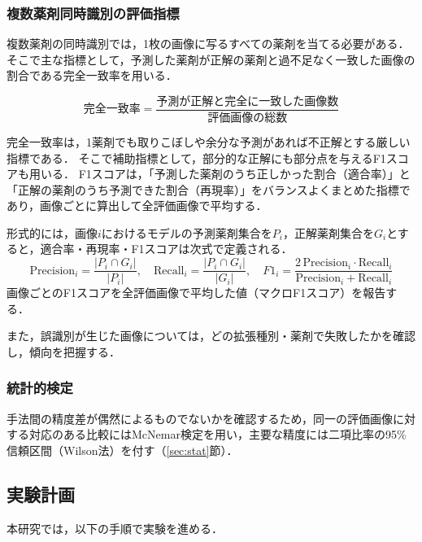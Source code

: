 \documentclass[dvipdfmx]{jsarticle}
\begin{document}
\subsubsection{複数薬剤同時識別の評価指標}

複数薬剤の同時識別では，1枚の画像に写るすべての薬剤を当てる必要がある．
そこで主な指標として，予測した薬剤が正解の薬剤と過不足なく一致した画像の割合である完全一致率を用いる．

\begin{equation}
\text{完全一致率} = \frac{\text{予測が正解と完全に一致した画像数}}{\text{評価画像の総数}}
\label{eq:exact}
\end{equation}

完全一致率は，1薬剤でも取りこぼしや余分な予測があれば不正解とする厳しい指標である．
そこで補助指標として，部分的な正解にも部分点を与えるF1スコアも用いる．
F1スコアは，「予測した薬剤のうち正しかった割合（適合率）」と「正解の薬剤のうち予測できた割合（再現率）」をバランスよくまとめた指標であり，画像ごとに算出して全評価画像で平均する．

形式的には，画像$i$におけるモデルの予測薬剤集合を$P_i$，正解薬剤集合を$G_i$とすると，適合率・再現率・F1スコアは次式で定義される．
\begin{equation}
\mathrm{Precision}_i = \frac{|P_i \cap G_i|}{|P_i|},\quad
\mathrm{Recall}_i = \frac{|P_i \cap G_i|}{|G_i|},\quad
F1_i = \frac{2\,\mathrm{Precision}_i \cdot \mathrm{Recall}_i}{\mathrm{Precision}_i + \mathrm{Recall}_i}
\label{eq:f1}
\end{equation}
画像ごとのF1スコアを全評価画像で平均した値（マクロF1スコア）を報告する．

また，誤識別が生じた画像については，どの拡張種別・薬剤で失敗したかを確認し，傾向を把握する．

\subsubsection{統計的検定}

手法間の精度差が偶然によるものでないかを確認するため，同一の評価画像に対する対応のある比較にはMcNemar検定を用い，主要な精度には二項比率の95\%信頼区間（Wilson法）を付す（\ref{sec:stat}節）．

\subsection{実験計画}

本研究では，以下の手順で実験を進める．
\end{document}
